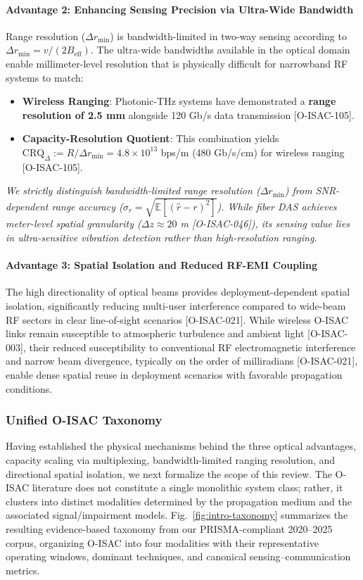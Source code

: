 \paragraph{Advantage 2: Enhancing Sensing Precision via Ultra-Wide Bandwidth}
Range resolution ($\Delta r_{\min}$) is bandwidth-limited in two-way sensing according to $\Delta r_{\min} = v/(2B_{\text{eff}})$. The ultra-wide bandwidths available in the optical domain enable millimeter-level resolution that is physically difficult for narrowband RF systems to match:
\begin{itemize}
\item \textbf{Wireless Ranging}: Photonic-THz systems have demonstrated a \textbf{range resolution of 2.5 mm} alongside 120 Gb/s data transmission [O-ISAC-105].
\item \textbf{Capacity-Resolution Quotient}: This combination yields $\mathrm{CRQ}_{\Delta} := R / \Delta r_{\min} = 4.8\times10^{13}$ bps/m (480 Gb/s/cm) for wireless ranging [O-ISAC-105].
\end{itemize}
\emph{We strictly distinguish bandwidth-limited range resolution ($\Delta r_{\min}$) from SNR-dependent range accuracy ($\sigma_r = \sqrt{\mathbb{E}[(\hat r-r)^2]}$). While fiber DAS achieves meter-level spatial granularity ($\Delta z \approx 20$ m [O-ISAC-046]), its sensing value lies in ultra-sensitive vibration detection rather than high-resolution ranging.}

\paragraph{Advantage 3: Spatial Isolation and Reduced RF-EMI Coupling}
The high directionality of optical beams provides deployment-dependent spatial isolation, significantly reducing multi-user interference compared to wide-beam RF sectors in clear line-of-sight scenarios [O-ISAC-021]. While wireless O-ISAC links remain susceptible to atmospheric turbulence and ambient light [O-ISAC-003], their reduced susceptibility to conventional RF electromagnetic interference and narrow beam divergence, typically on the order of milliradians [O-ISAC-021], enable dense spatial reuse in deployment scenarios with favorable propagation conditions.

\subsubsection{Unified O-ISAC Taxonomy}

Having established the physical mechanisms behind the three optical advantages, capacity scaling via multiplexing, bandwidth-limited ranging resolution, and directional spatial isolation, we next formalize the scope of this review. The O-ISAC literature does not constitute a single monolithic system class; rather, it clusters into distinct modalities determined by the propagation medium and the associated signal/impairment models. Fig.~\ref{fig:intro-taxonomy} summarizes the resulting evidence-based taxonomy from our PRISMA-compliant 2020--2025 corpus, organizing O-ISAC into four modalities with their representative operating windows, dominant techniques, and canonical sensing--communication metrics.


